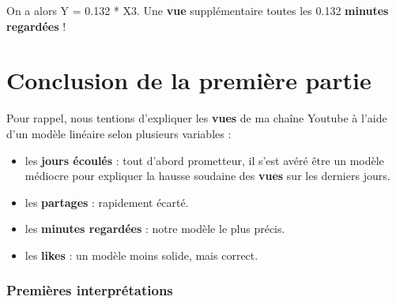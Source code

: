 On a alors Y = 0.132 * X3. Une \textbf{vue} supplémentaire toutes les
0.132 \textbf{minutes regardées} !

\hypertarget{conclusion-de-la-premiuxe8re-partie}{%
\section{Conclusion de la première
partie}\label{conclusion-de-la-premiuxe8re-partie}}

Pour rappel, nous tentions d'expliquer les \textbf{vues} de ma chaîne
Youtube à l'aide d'un modèle linéaire selon plusieurs variables :

\begin{itemize}
\tightlist
\item
  les \textbf{jours écoulés} : tout d'abord prometteur, il s'est avéré
  être un modèle médiocre pour expliquer la hausse soudaine des
  \textbf{vues} sur les derniers jours.
\item
  les \textbf{partages} : rapidement écarté.
\item
  les \textbf{minutes regardées} : notre modèle le plus précis.
\item
  les \textbf{likes} : un modèle moins solide, mais correct.
\end{itemize}

\hypertarget{premiuxe8res-interpruxe9tations}{%
\subsubsection{Premières
interprétations}\label{premiuxe8res-interpruxe9tations}}

